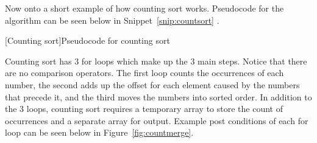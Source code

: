 \documentclass[12pt]{article}
\begin{document}
	Now onto a short example of how counting sort works.
	Pseudocode for the algorithm can be seen below in Snippet~\ref{snip:countsort}
.	\begin{center}
		[Counting sort]{Pseudocode for counting sort\cite[p.~195]{intro}}
		
		\label{snip:countsort}
	\end{center}
	
	Counting sort has 3 for loops which make up the 3 main steps. 
	Notice that there are no comparison operators.
	The first loop counts the occurrences of each number, the second adds up the offset for each element caused by the numbers that precede it, and the third moves the numbers into sorted order.
	In addition to the 3 loops, counting sort requires a temporary array to store the count of occurrences and a separate array for output.
	Example post conditions of each for loop can be seen below in Figure~\ref{fig:countmerge}.
\end{document}
